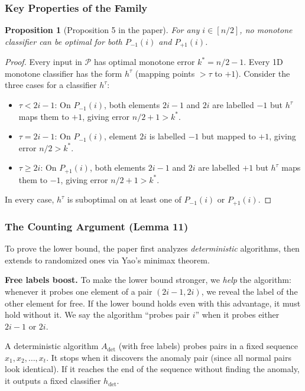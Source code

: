 \documentclass[11pt, a4paper]{article}
\theoremstyle{boxed}
\newtheorem{innerproposition}{Proposition}[section]
\newenvironment{proposition}
  {\begin{mdframed}[style=propstyle]\begin{innerproposition}}
  {\end{innerproposition}\end{mdframed}}
\newcommand{\kstar}{k^{*}}
\begin{document}
\subsubsection{Key Properties of the Family}

\begin{proposition}[Proposition 5 in the paper]\label{prop:no-shared-opt}
  For any $i \in [n/2]$, no monotone classifier can be optimal for \emph{both} $P_{-1}(i)$ and $P_{+1}(i)$.
\end{proposition}

\begin{proof}
  Every input in $\mathcal{P}$ has optimal monotone error $\kstar = n/2 - 1$. Every 1D monotone classifier has the form $h^\tau$ (mapping points $> \tau$ to $+1$). Consider the three cases for a classifier $h^\tau$:
  \begin{itemize}
    \item $\tau < 2i - 1$: On $P_{-1}(i)$, both elements $2i-1$ and $2i$ are labelled $-1$ but $h^\tau$ maps them to $+1$, giving error $n/2 + 1 > \kstar$.
    \item $\tau = 2i - 1$: On $P_{-1}(i)$, element $2i$ is labelled $-1$ but mapped to $+1$, giving error $n/2 > \kstar$.
    \item $\tau \geq 2i$: On $P_{+1}(i)$, both elements $2i-1$ and $2i$ are labelled $+1$ but $h^\tau$ maps them to $-1$, giving error $n/2 + 1 > \kstar$.
  \end{itemize}
  In every case, $h^\tau$ is suboptimal on at least one of $P_{-1}(i)$ or $P_{+1}(i)$.
\end{proof}


\subsubsection{The Counting Argument (Lemma 11)}

To prove the lower bound, the paper first analyzes \emph{deterministic} algorithms, then extends to randomized ones via Yao's minimax theorem.

\medskip
\noindent\textbf{Free labels boost.} To make the lower bound stronger, we \emph{help} the algorithm: whenever it probes one element of a pair $(2i-1, 2i)$, we reveal the label of the other element for free. If the lower bound holds even with this advantage, it must hold without it. We say the algorithm ``probes pair $i$'' when it probes either $2i-1$ or $2i$.

\medskip
A deterministic algorithm $A_\mathrm{det}$ (with free labels) probes pairs in a fixed sequence $x_1, x_2, \ldots, x_t$. It stops when it discovers the anomaly pair (since all normal pairs look identical). If it reaches the end of the sequence without finding the anomaly, it outputs a fixed classifier $h_\mathrm{det}$.
\end{document}
